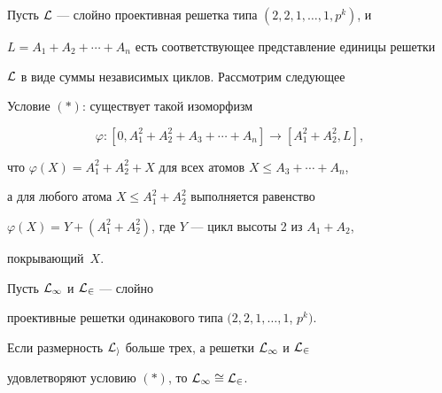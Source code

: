 Пусть $\cal L$ --- слойно проективная решетка типа $(2,2,1,\dotsc,1,p^k)$, и


$L=A_1+A_2+\dotsb+A_n$ есть соответствующее представление единицы решетки


$\cal L$ в виде суммы независимых циклов. Рассмотрим следующее


\smallskip





Условие $(\ast)$: существует такой изоморфизм


$$


\varphi : [0,A_1^2+A_2^2+A_3+\dotsb+A_n] \to [A_1^2+A_2^2,L],


$$


что $\varphi(X)=A_1^2+A_2^2+X$ для всех атомов $X \leq A_3+\dotsb+A_n$,


а для любого атома $X \leq A_1^2+A_2^2$ выполняется равенство


$\varphi(X)=Y+(A_1^2+A_2^2)$, где $Y$ --- цикл высоты 2 из $A_1+A_2$,


покрывающий~$X$.





\begin{thm}


Пусть $\cal L_1$ и $\cal L_2$ --- слойно


проективные решетки одинакового типа $(2,2,1,\dotsc,1$, $p^k).$




Если размерность $\cal L_i$ больше трех, а решетки $\cal L_1$ и $\cal L_2$


удовлетворяют условию $(\ast)$, то $\cal L_1 \cong \cal L_2$.


\end{thm}





